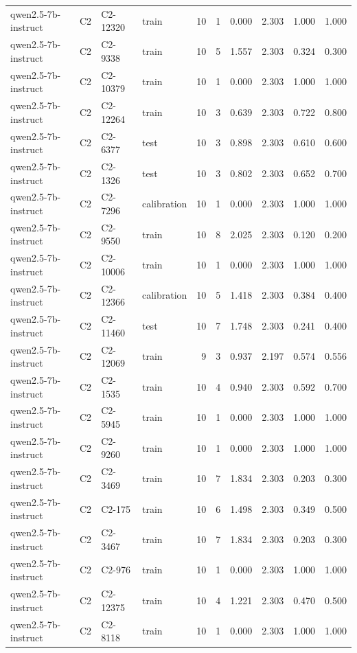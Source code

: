 \begin{table}
\begin{tabular}{llllrrrrrr}
qwen2.5-7b-instruct & C2 & C2-12320 & train & 10 & 1 & 0.000 & 2.303 & 1.000 & 1.000 \\
qwen2.5-7b-instruct & C2 & C2-9338 & train & 10 & 5 & 1.557 & 2.303 & 0.324 & 0.300 \\
qwen2.5-7b-instruct & C2 & C2-10379 & train & 10 & 1 & 0.000 & 2.303 & 1.000 & 1.000 \\
qwen2.5-7b-instruct & C2 & C2-12264 & train & 10 & 3 & 0.639 & 2.303 & 0.722 & 0.800 \\
qwen2.5-7b-instruct & C2 & C2-6377 & test & 10 & 3 & 0.898 & 2.303 & 0.610 & 0.600 \\
qwen2.5-7b-instruct & C2 & C2-1326 & test & 10 & 3 & 0.802 & 2.303 & 0.652 & 0.700 \\
qwen2.5-7b-instruct & C2 & C2-7296 & calibration & 10 & 1 & 0.000 & 2.303 & 1.000 & 1.000 \\
qwen2.5-7b-instruct & C2 & C2-9550 & train & 10 & 8 & 2.025 & 2.303 & 0.120 & 0.200 \\
qwen2.5-7b-instruct & C2 & C2-10006 & train & 10 & 1 & 0.000 & 2.303 & 1.000 & 1.000 \\
qwen2.5-7b-instruct & C2 & C2-12366 & calibration & 10 & 5 & 1.418 & 2.303 & 0.384 & 0.400 \\
qwen2.5-7b-instruct & C2 & C2-11460 & test & 10 & 7 & 1.748 & 2.303 & 0.241 & 0.400 \\
qwen2.5-7b-instruct & C2 & C2-12069 & train & 9 & 3 & 0.937 & 2.197 & 0.574 & 0.556 \\
qwen2.5-7b-instruct & C2 & C2-1535 & train & 10 & 4 & 0.940 & 2.303 & 0.592 & 0.700 \\
qwen2.5-7b-instruct & C2 & C2-5945 & train & 10 & 1 & 0.000 & 2.303 & 1.000 & 1.000 \\
qwen2.5-7b-instruct & C2 & C2-9260 & train & 10 & 1 & 0.000 & 2.303 & 1.000 & 1.000 \\
qwen2.5-7b-instruct & C2 & C2-3469 & train & 10 & 7 & 1.834 & 2.303 & 0.203 & 0.300 \\
qwen2.5-7b-instruct & C2 & C2-175 & train & 10 & 6 & 1.498 & 2.303 & 0.349 & 0.500 \\
qwen2.5-7b-instruct & C2 & C2-3467 & train & 10 & 7 & 1.834 & 2.303 & 0.203 & 0.300 \\
qwen2.5-7b-instruct & C2 & C2-976 & train & 10 & 1 & 0.000 & 2.303 & 1.000 & 1.000 \\
qwen2.5-7b-instruct & C2 & C2-12375 & train & 10 & 4 & 1.221 & 2.303 & 0.470 & 0.500 \\
qwen2.5-7b-instruct & C2 & C2-8118 & train & 10 & 1 & 0.000 & 2.303 & 1.000 & 1.000 \\

\end{tabular}
\end{table}
